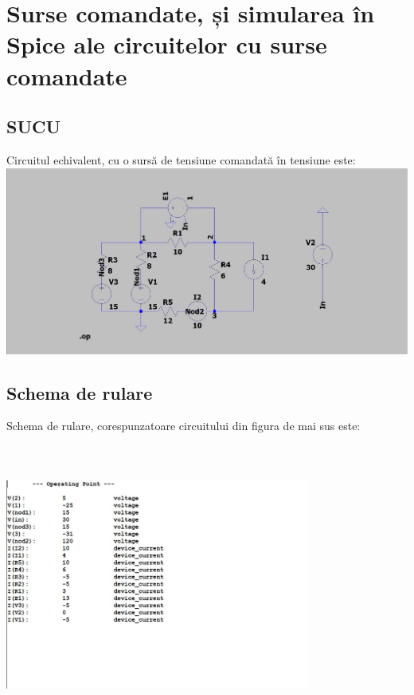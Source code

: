 \documentclass[12pt,twoside]{article}
\begin{document}
\newpage
\section{Surse comandate, și simularea în Spice ale circuitelor cu surse comandate}
\subsection{SUCU}
Circuitul echivalent, cu o sursă de tensiune comandată în tensiune este:
\includegraphics [scale=0.2]{sucu.jpg}

\subsection{Schema de rulare}
Schema de rulare, corespunzatoare circuitului din figura de mai sus este: 
\includegraphics[width=10cm, height=10cm]{sucu-netlist.jpg}

\newpage
\end{document}
